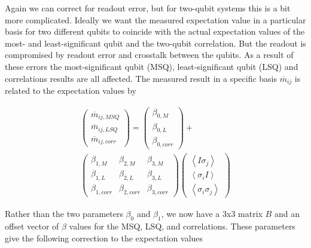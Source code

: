 Again we can correct for readout error, but for two-qubit systems this is a bit
more complicated. Ideally we want the measured expectation value in a particular
basis for two different qubits to coincide with the actual expectation values of
the most- and least-significant qubit and the two-qubit correlation. But the
readout is compromised by readout error and crosstalk between the qubits. As a
result of these errors the most-significant qubit (MSQ), least-significant qubit
(LSQ) and correlations results are all affected. The measured result
in a specific basis $\overline{m}_{ij}$ is related to the expectation values by

\begin{equation}
\label{beta}
\begin{split}
\begin{pmatrix} \overline{m}_{ij,MSQ} \\ \overline{m}_{ij,LSQ} \\
\overline{m}_{ij,corr}
\end{pmatrix}=\begin{pmatrix} \beta_{0,M} \\ \beta_{0,L} \\ \beta_{0,corr}
\end{pmatrix}+\\\begin{pmatrix} \beta_{1,M}&\beta_{2,M}&\beta_{3,M} \\
\beta_{1,L}&\beta_{2,L}&\beta_{3,L} \\
\beta_{1,corr}&\beta_{2,corr}&\beta_{3,corr}
\end{pmatrix}\begin{pmatrix} \left\langle I\sigma_j\right\rangle \\ \left\langle
\sigma_iI\right\rangle \\ \left\langle \sigma_i\sigma_j\right\rangle
\end{pmatrix}
\end{split}
\end{equation}

Rather than the two parameters $\beta_0$ and $\beta_1$, we now have a 3x3
matrix $B$ and an offset vector of $\beta$ values for the MSQ, LSQ, and
correlations. These parameters give the following correction to the expectation values

